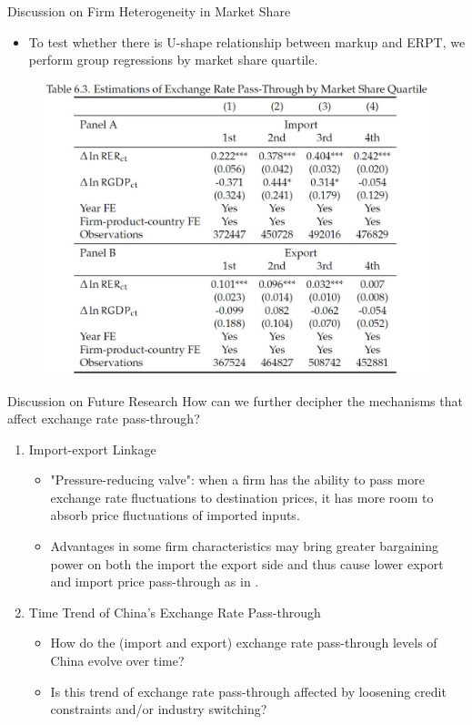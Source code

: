 \documentclass[10pt]{beamer}
\begin{document}
\begin{frame}{Discussion on Firm Heterogeneity in Market Share}
	\begin{itemize}
		\item To test whether there is U-shape relationship between markup and ERPT, we perform group regressions by market share quartile.
	\end{itemize}
	\begin{figure}[htbp]
		\centering
		\includegraphics[width=0.8\columnwidth]{Table6.3.jpg}
		\label{tab6.3}
	\end{figure}
\end{frame}

\begin{frame}{Discussion on Future Research}
How can we further decipher the mechanisms that affect exchange rate pass-through?
	\begin{enumerate}
		\item Import-export Linkage
		\begin{itemize}
			\item "Pressure-reducing
			valve": when a firm has the ability to pass more exchange rate fluctuations to destination prices, it has more room to absorb price fluctuations of imported inputs.
			\item Advantages in some firm characteristics may bring
			greater bargaining power on both the import the export side and thus cause lower export and import price pass-through as in \cite{aik2014}.
		\end{itemize}
		\item Time Trend of China’s Exchange Rate Pass-through
		\begin{itemize}
			\item How do the (import and export) exchange rate pass-through levels of China evolve over time?
			\item Is this trend of exchange rate pass-through affected by loosening credit constraints and/or industry switching?
		\end{itemize}
	\end{enumerate}
\end{frame}
\end{document}
